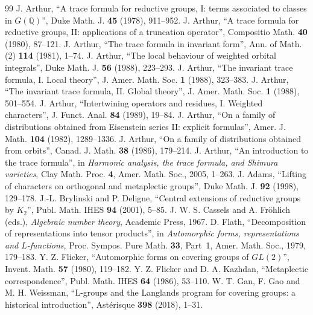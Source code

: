 \documentclass[11pt]{article}
\numberwithin{equation}{section}
\theoremstyle{plain}
\theoremstyle{definition}
\theoremstyle{remark}
\begin{document}
\begin{thebibliography}{99}
 J. Arthur, ``A trace formula for reductive groups, I: terms
associated to classes in $G(\mathbb{Q})$'', Duke Math. J. \textbf{45} (1978), 911--952.
 J. Arthur, ``A trace formula for reductive groups, II:
applications of a truncation operator'', Compositio Math. \textbf{40}
(1980), 87--121.
 J. Arthur, ``The trace formula in invariant form'', Ann.
of Math. (2) \textbf{114} (1981), 1--74.
 J. Arthur, ``The local behaviour of weighted orbital
integrals'', Duke Math. J. \textbf{56} (1988), 223--293.
 J. Arthur, ``The invariant trace formula, I. Local theory'',
J. Amer. Math. Soc. \textbf{1} (1988), 323--383.
 J. Arthur, ``The invariant trace formula, II. Global
theory'', J. Amer. Math. Soc. \textbf{1} (1988), 501--554.
 J. Arthur, ``Intertwining operators and residues, I.
Weighted characters'', J. Funct. Anal. \textbf{84} (1989), 19--84.
 J. Arthur, ``On a family of distributions obtained from
Eisenstein series II: explicit formulas'', Amer. J. Math. \textbf{104}
(1982), 1289--1336.
 J. Arthur, ``On a family of distributions obtained from
orbits'', Canad. J. Math. \textbf{38} (1986), 179--214.
 J. Arthur, ``An introduction to the trace formula'', in
\emph{Harmonic analysis, the trace formula, and Shimura varieties}, Clay
Math. Proc. \textbf{4}, Amer. Math. Soc., 2005, 1--263.
 J. Adams, ``Lifting of characters on orthogonal and
metaplectic groups'', Duke Math. J. \textbf{92} (1998), 129--178.
 J.-L. Brylinski and P. Deligne, ``Central extensions of
reductive groups by $K_2$'', Publ. Math. IHES \textbf{94} (2001), 5--85.
 J. W. S. Cassels and A. Fr\"ohlich (eds.), \emph{Algebraic
number theory}, Academic Press, 1967.
 D. Flath, ``Decomposition of representations into tensor
products'', in \emph{Automorphic forms, representations and
$L$-functions}, Proc. Sympos. Pure Math. \textbf{33}, Part~1, Amer. Math.
Soc., 1979, 179--183.
 Y. Z. Flicker, ``Automorphic forms on covering groups of
$GL(2)$'', Invent. Math. \textbf{57} (1980), 119--182.
 Y. Z. Flicker and D. A. Kazhdan, ``Metaplectic
correspondence'', Publ. Math. IHES \textbf{64} (1986), 53--110.
 W. T. Gan, F. Gao and M. H. Weissman, ``L-groups and the
Langlands program for covering groups: a historical introduction'',
Ast\'erisque \textbf{398} (2018), 1--31.

\end{thebibliography}
\end{document}

